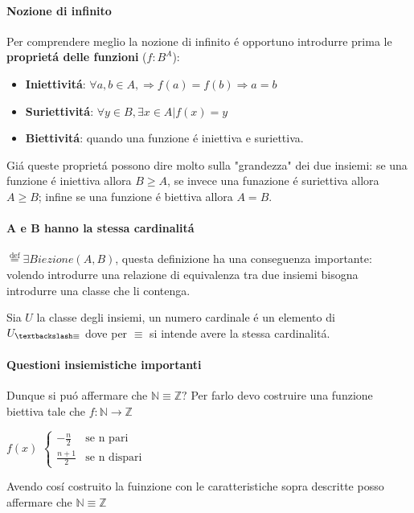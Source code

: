 \documentclass{article}
\begin{document}
\paragraph{Nozione di infinito}
Per comprendere meglio la nozione di infinito é opportuno introdurre prima le \textbf{proprietá delle funzioni} ($f: B^A$):
\begin{itemize}
    \item \textbf{Iniettivitá}: $\forall a,b\in A, \Rightarrow f(a) = f(b) \Rightarrow a = b$
    \item \textbf{Suriettivitá}: $\forall y\in B, \exists x\in A | f(x) = y$
    \item \textbf{Biettivitá}: quando una funzione é iniettiva e suriettiva.
\end{itemize}
Giá queste proprietá possono dire molto sulla "grandezza" dei due insiemi: se una funzione é iniettiva allora $B \geq A$, se invece una funazione é suriettiva allora $A \geq B$; infine se una funzione é biettiva allora $A=B$.

\paragraph{A e B hanno la stessa cardinalitá}  $\stackrel{\mathrm{def}}{=} \exists Biezione (A,B)$, questa definizione ha una conseguenza importante: volendo introdurre una relazione di equivalenza tra due insiemi bisogna introdurre una classe che li contenga.

Sia $U$ la classe degli insiemi, un numero cardinale é un elemento di $U_{\textbackslash\equiv}$ dove per $\equiv$ si intende avere la stessa cardinalitá.

\paragraph{Questioni insiemistiche importanti}

Dunque si puó affermare che $\mathbb{N}\equiv \mathbb{Z}?$
Per farlo devo costruire una funzione biettiva tale che $f:\mathbb{N} \rightarrow \mathbb{Z} $

$f(x)$
$\begin{cases}
    -\frac{n}{2} & \text{se n pari}\\
    \frac{n+1}{2}& \text{se n dispari}
\end{cases}$

Avendo cosí costruito la fuinzione con le caratteristiche sopra descritte posso affermare che $\mathbb{N}\equiv \mathbb{Z}$
\end{document}

